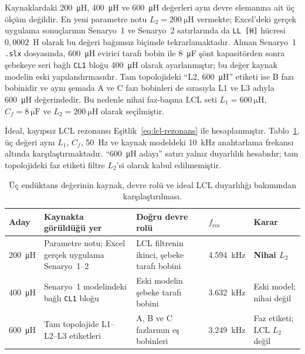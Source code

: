 Kaynaklardaki \SI{200}{\micro\henry}, \SI{400}{\micro\henry} ve \SI{600}{\micro\henry} değerleri aynı devre elemanına ait üç ölçüm değildir. En yeni parametre notu $L_2=\SI{200}{\micro\henry}$ vermekte; Excel'deki gerçek uygulama sonuçlarının Senaryo~1 ve Senaryo~2 satırlarında da \texttt{LL [H]} hücresi $0{,}0002$~H olarak bu değeri bağımsız biçimde tekrarlamaktadır. Alınan Senaryo~1 \texttt{.slx} dosyasında, \SI{600}{\micro\henry} evirici tarafı bobin ile \SI{8}{\micro\farad} şönt kapasitörden sonra şebekeye seri bağlı \texttt{CL1} bloğu \SI{400}{\micro\henry} olarak ayarlanmıştır; bu değer kaynak modelin eski yapılandırmasıdır. Tam topolojideki ``L2, \SI{600}{\micro\henry}'' etiketi ise B fazı bobinidir ve aynı şemada A ve C fazı bobinleri de sırasıyla L1 ve L3 adıyla \SI{600}{\micro\henry} değerindedir. Bu nedenle nihai faz-başına LCL seti $L_1=\SI{600}{\micro\henry}$, $C_f=\SI{8}{\micro\farad}$ ve $L_2=\SI{200}{\micro\henry}$ olarak seçilmiştir.

İdeal, kayıpsız LCL rezonansı Eşitlik~\eqref{eq:lcl-rezonans} ile hesaplanmıştır.
Tablo~\ref{tab:l2-aday-karsilastirma}, üç değeri aynı $L_1$, $C_f$, \SI{50}{\hertz} ve kaynak modeldeki \SI{10}{\kilo\hertz} anahtarlama frekansı altında karşılaştırmaktadır. ``\SI{600}{\micro\henry} adayı'' satırı yalnız duyarlılık hesabıdır; tam topolojideki faz etiketi filtre $L_2$'si olarak kabul edilmemiştir.

\begin{table}[htbp]
  \centering
  \caption{Üç endüktans değerinin kaynak, devre rolü ve ideal LCL duyarlılığı bakımından karşılaştırılması.}
  \label{tab:l2-aday-karsilastirma}
  \footnotesize
  \renewcommand{\arraystretch}{1.10}
  \begin{tabularx}{\textwidth}{>{\raggedright\arraybackslash}p{} >{\raggedright\arraybackslash}p{} >{\raggedright\arraybackslash}p{} >{\raggedright\arraybackslash}p{} >{\raggedright\arraybackslash}X}
    \toprule
    Aday & Kaynakta görüldüğü yer & Doğru devre rolü & $f_{\mathrm{res}}$ & Karar \\
    \midrule
    \SI{200}{\micro\henry} & Parametre notu; Excel gerçek uygulama Senaryo~1--2 & LCL filtrenin ikinci, şebeke tarafı bobini & \SI{4.594}{\kilo\hertz} & \textbf{Nihai $L_2$} \\
    \SI{400}{\micro\henry} & Senaryo~1 modelindeki bağlı \texttt{CL1} bloğu & Eski modelin şebeke tarafı bobini & \SI{3.632}{\kilo\hertz} & Eski model; nihai değil \\
    \SI{600}{\micro\henry} & Tam topolojide L1--L2--L3 etiketleri & A, B ve C fazlarının eş bobinleri & \SI{3.249}{\kilo\hertz} & Faz etiketi; LCL $L_2$ değil \\
    \bottomrule
  \end{tabularx}
\end{table}

